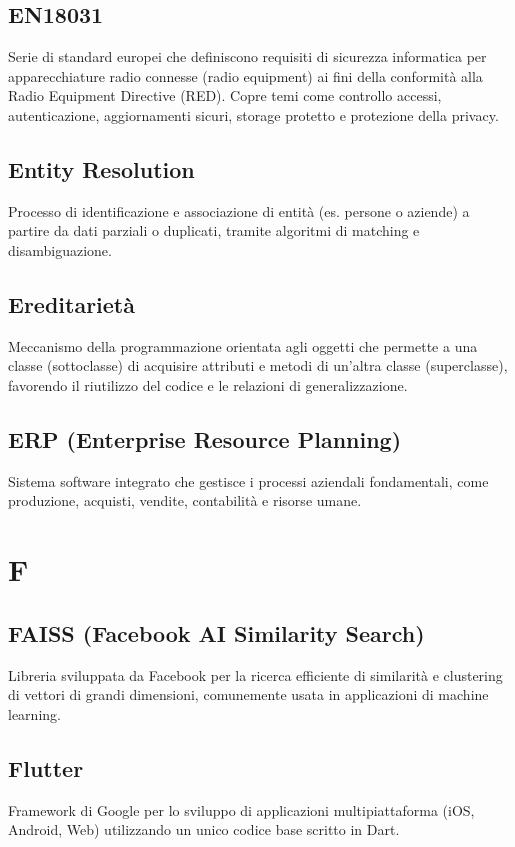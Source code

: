 \documentclass[a4paper,11pt]{article}
\begin{document}
\subsection{EN18031}
Serie di standard europei che definiscono requisiti di sicurezza informatica per apparecchiature radio connesse (radio equipment) ai fini della conformità alla Radio Equipment Directive (RED). Copre temi come controllo accessi, autenticazione, aggiornamenti sicuri, storage protetto e protezione della privacy.

\subsection{Entity Resolution}
Processo di identificazione e associazione di entità (es. persone o aziende) a partire da dati parziali o duplicati, tramite algoritmi di matching e disambiguazione.

\subsection{Ereditarietà}
Meccanismo della programmazione orientata agli oggetti che permette a una classe (sottoclasse) di acquisire attributi e metodi di un'altra classe (superclasse), favorendo il riutilizzo del codice e le relazioni di generalizzazione.

\subsection{ERP (Enterprise Resource Planning)}
Sistema software integrato che gestisce i processi aziendali fondamentali, come produzione, acquisti, vendite, contabilità e risorse umane.

\newpage
\section{F}

\subsection{FAISS (Facebook AI Similarity Search)}
Libreria sviluppata da Facebook per la ricerca efficiente di similarità e clustering di vettori di grandi dimensioni, comunemente usata in applicazioni di machine learning.

\subsection{Flutter}
Framework di Google per lo sviluppo di applicazioni multipiattaforma (iOS, Android, Web) utilizzando un unico codice base scritto in Dart.
\end{document}
